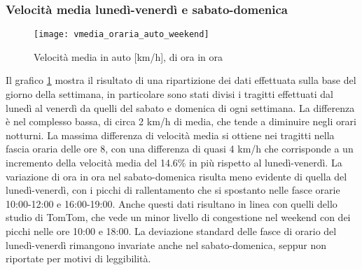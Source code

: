 \subsubsection{Velocità media lunedì-venerdì e sabato-domenica}

\begin{figure}[H]
\texttt{[image: vmedia\_oraria\_auto\_weekend]}
\caption{Velocità media in auto [km/h], di ora in ora}
\label{image:4}
\end{figure}


Il grafico \ref{image:4} mostra il risultato di una ripartizione dei dati effettuata sulla base del giorno della settimana, in particolare sono stati divisi i tragitti effettuati dal lunedì al venerdì da quelli del sabato e domenica di ogni settimana. La differenza è nel complesso bassa, di circa 2 km/h di media, che tende a diminuire negli orari notturni. La massima differenza di velocità media si ottiene nei tragitti nella fascia oraria delle ore 8, con una differenza di quasi 4 km/h che corrisponde a un incremento della velocità media del 14.6\% in più rispetto al lunedì-venerdì. La variazione di ora in ora nel sabato-domenica risulta meno evidente di quella del lunedì-venerdì, con i picchi di rallentamento che si spostanto nelle fasce orarie 10:00-12:00 e 16:00-19:00. Anche questi dati risultano in linea con quelli dello studio di TomTom\cite{tomtomindexmilan}, che vede un minor livello di congestione nel weekend con dei picchi nelle ore 10:00 e 18:00. La deviazione standard delle fasce di orario del lunedì-venerdì rimangono invariate anche nel sabato-domenica, seppur non riportate per motivi di leggibilità.


